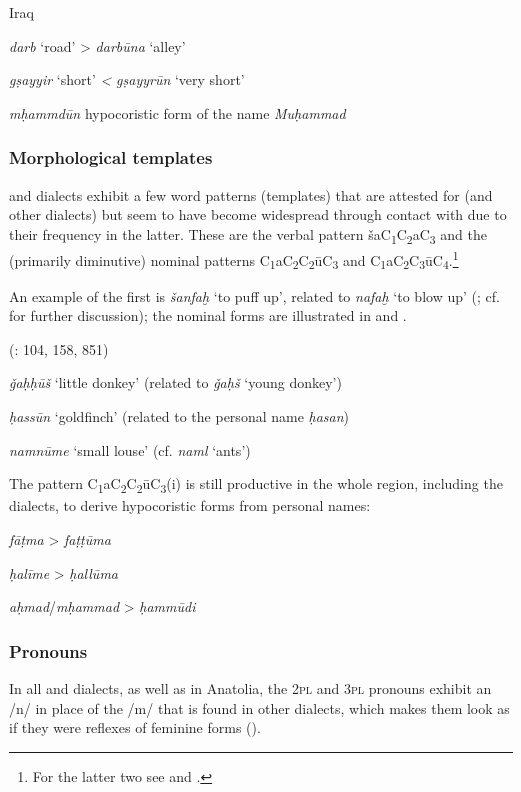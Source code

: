 \documentclass[output=paper]{langsci/langscibook}
\begin{document}
\ea\label{una}
Iraq \citep[72]{Masliyah1997}

\textit{darb} ‘road’ > \textit{darbūna} ‘alley’

\textit{gṣayyir} ‘short’ \textit{<} \textit{gṣayyrūn} ‘very short’

\textit{mḥammdūn} hypocoristic form of the name \textit{Muḥammad}
\z

\subsubsection{Morphological templates}
 and  dialects exhibit a few word patterns (templates) that are attested for  (and other dialects) but seem to have become widespread through contact with  due to their {frequency} in the latter. These are the verbal pattern šaC\textsubscript{1}C\textsubscript{2}aC\textsubscript{3} and the (primarily {diminutive}) nominal patterns C\textsubscript{1}aC\textsubscript{2}C\textsubscript{2}ūC\textsubscript{3} and C\textsubscript{1}aC\textsubscript{2}C\textsubscript{3}ūC\textsubscript{4}.\footnote{For the latter two see \citet{Corriente1969} and \citet{Procházka2004}.}\textsubscript{} 

An example of the first is \textit{šanfaḫ} ‘to puff up’, related to \textit{nafaḫ} ‘to blow up’ (\citealt[83]{Féghali1918}; cf. \citealt[201]{Lentin2018} for further discussion); the nominal forms are illustrated in  and .

\ea\label{donkey}
 (\citealt{Barthélemy1935}: 104, 158, 851) 

\textit{ǧaḥḥūš} ‘little donkey’ (related to \textit{ǧaḥš} `young donkey')

\textit{ḥassūn} ‘goldfinch’ (related to the personal name \textit{ḥasan})

\textit{namnūme} ‘small louse’ (cf. \textit{naml} `ants')
\z

The pattern C\textsubscript{1}aC\textsubscript{2}C\textsubscript{2}ūC\textsubscript{3}(i)\textsubscript{} is still productive in the whole region, including the  dialects, to derive hypocoristic forms from personal names:

\ea\label{fatima}
\textit{fāṭma} > \textit{faṭṭūma}

\textit{ḥalīme} > \textit{ḥallūma}

\textit{aḥmad}/\textit{mḥammad} > \textit{ḥammūdi} 
\z

\subsubsection{Pronouns}
In all  and  dialects, as well as in {Anatolia}, the \textsc{2pl} and \textsc{3pl} pronouns exhibit an /n/ in place of the /m/ that is found in other  dialects, which makes them look as if they were reflexes of  feminine forms (). 
\end{document}

